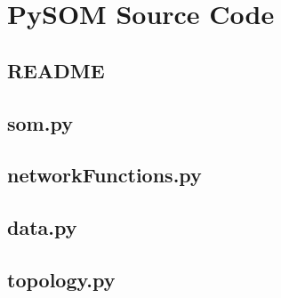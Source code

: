 \appendix
%
%

\chapter{PySOM Source Code}
\section{README}

\label{append:somcode}
\section{som.py}

\section{networkFunctions.py}

\section{data.py}

\section{topology.py}


